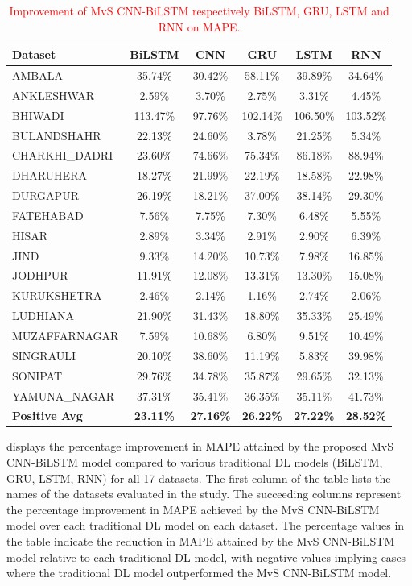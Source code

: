 \documentclass[a4paper, fleqn]{cas-sc}
\theoremstyle{definition}
\theoremstyle{remark}
\begin{document}
  \begin{table}[]
    \caption{ \textcolor{red}{Improvement of MvS CNN-BiLSTM respectively BiLSTM,  GRU,  LSTM and RNN on MAPE.}}
    \label{MAPE imp}
    \begin{tabular}{lccccc}
    \hline   Dataset       &   BiLSTM &CNN & GRU &   LSTM &   RNN  \\ \hline
    AMBALA & 35.74\% & 30.42\% & 58.11\% & 39.89\% & 34.64\% \\
    ANKLESHWAR & 2.59\% & 3.70\% & 2.75\% & 3.31\% & 4.45\% \\
    BHIWADI & 113.47\% & 97.76\% & 102.14\% & 106.50\% & 103.52\% \\
    BULANDSHAHR & 22.13\% & 24.60\% & 3.78\% & 21.25\% & 5.34\% \\
    CHARKHI\_DADRI & 23.60\% & 74.66\% & 75.34\% & 86.18\% & 88.94\% \\
    DHARUHERA & 18.27\% & 21.99\% & 22.19\% & 18.58\% & 22.98\% \\
    DURGAPUR & 26.19\% & 18.21\% & 37.00\% & 38.14\% & 29.30\% \\
    FATEHABAD & 7.56\% & 7.75\% & 7.30\% & 6.48\% & 5.55\% \\
    HISAR & 2.89\% & 3.34\% & 2.91\% & 2.90\% & 6.39\% \\
    JIND & 9.33\% & 14.20\% & 10.73\% & 7.98\% & 16.85\% \\
    JODHPUR & 11.91\% & 12.08\% & 13.31\% & 13.30\% & 15.08\% \\
    KURUKSHETRA & 2.46\% & 2.14\% & 1.16\% & 2.74\% & 2.06\% \\
    LUDHIANA & 21.90\% & 31.43\% & 18.80\% & 35.33\% & 25.49\% \\
    MUZAFFARNAGAR & 7.59\% & 10.68\% & 6.80\% & 9.51\% & 10.49\% \\
    SINGRAULI & 20.10\% & 38.60\% & 11.19\% & 5.83\% & 39.98\% \\
    SONIPAT & 29.76\% & 34.78\% & 35.87\% & 29.65\% & 32.13\% \\
    YAMUNA\_NAGAR & 37.31\% & 35.41\% & 36.35\% & 35.11\% & 41.73\% \\ \hline
    \textbf{Positive Avg} & \textbf{23.11\% }& \textbf{27.16\% }& \textbf{26.22\%} & \textbf{27.22\%} & \textbf{28.52\%} \\ \hline
    \end{tabular}
    \end{table}
     displays the percentage improvement in MAPE attained by the proposed MvS CNN-BiLSTM model compared to various traditional DL models (BiLSTM,  GRU,  LSTM,  RNN) for all 17 datasets. The first column of the table lists the names of the datasets evaluated in the study. The succeeding columns represent the percentage improvement in MAPE achieved by the MvS CNN-BiLSTM model over each traditional DL model on each dataset. The percentage values in the table indicate the reduction in MAPE attained by the MvS CNN-BiLSTM model relative to each traditional DL model,  with negative values implying cases where the traditional DL model outperformed the MvS CNN-BiLSTM model.
\end{document}
